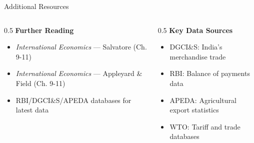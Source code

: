 \documentclass[
  ignorenonframetext,
  aspectratio=169,
]{beamer}
\makeatletter
\providecommand{\tightlist}{%
  \setlength{\itemsep}{0pt}\setlength{\parskip}{0pt}}
\let\quarto@originallabel\label
\DeclareRobustCommand*{\label}[1]{\quarto@originallabel{#1}}
\makeatother
\begin{document}
\begin{frame}{Additional Resources}
\label{additional-resources}
\begin{columns}[T]
\begin{column}{0.5\linewidth}
\textbf{Further Reading}

\begin{itemize}
\tightlist
\item
  \emph{International Economics} --- Salvatore (Ch. 9-11)
\item
  \emph{International Economics} --- Appleyard \& Field (Ch. 9-11)
\item
  RBI/DGCI\&S/APEDA databases for latest data
\end{itemize}
\end{column}

\begin{column}{0.5\linewidth}
\textbf{Key Data Sources}

\begin{itemize}
\tightlist
\item
  DGCI\&S: India's merchandise trade
\item
  RBI: Balance of payments data\\
\item
  APEDA: Agricultural export statistics
\item
  WTO: Tariff and trade databases
\end{itemize}
\end{column}
\end{columns}
\end{frame}
\end{document}
